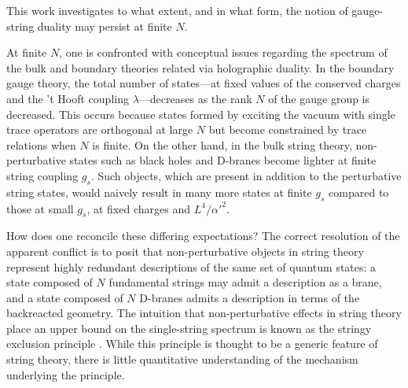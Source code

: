 \documentclass[a4paper,12pt]{article}
\begin{document}
This work investigates to what extent, and in what form, the notion of gauge-string duality may persist at finite $N$. 

At finite $N$, one is confronted with conceptual issues regarding the spectrum of the bulk and boundary theories related via holographic duality. In the boundary gauge theory, the total number of states---at fixed values of the conserved charges and the 't Hooft coupling $\lambda$---decreases as the rank $N$ of the gauge group is decreased. This occurs because states formed by exciting the vacuum with single trace operators are orthogonal at large $N$ but become constrained by trace relations when $N$ is finite. On the other hand, in the bulk string theory, non-perturbative states such as black holes and D-branes become lighter at finite string coupling $g_s$. Such objects, which are present in addition to the perturbative string states, would naively result in many more states at finite $g_s$ compared to those at small $g_s$, at fixed charges and $L^4/\alpha'^2$.

How does one reconcile these differing expectations? The correct resolution of the apparent conflict is to posit that non-perturbative objects in string theory represent highly redundant descriptions of the same set of quantum states: a state composed of $N$ fundamental strings may admit a description as a brane, and a state composed of $N$ D-branes admits a description in terms of the backreacted geometry. The intuition that non-perturbative effects in string theory place an upper bound on the single-string spectrum is known as the stringy exclusion principle \cite{Maldacena:1998bw,Myers:1999ps,McGreevy:2000cw}. While this principle is thought to be a generic feature of string theory, there is little quantitative understanding of the mechanism underlying the principle.
\end{document}
